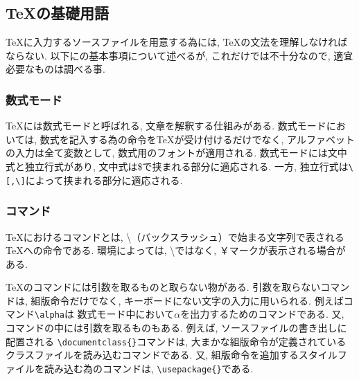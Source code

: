 \documentclass[12pt,xelatex,ja=standard]{bxjsarticle}
\begin{document}
\subsection{\TeX の基礎用語}
\TeX に入力するソースファイルを用意する為には,
\TeX の文法を理解しなければならない.
以下に\XeLaTeX の基本事項について述べるが,
これだけでは不十分なので,
適宜必要なものは調べる事.

\subsubsection{数式モード}
\TeX には数式モードと呼ばれる,
文章を解釈する仕組みがある.
数式モードにおいては,
数式を記入する為の命令を\TeX が受け付けるだけでなく,
アルファベットの入力は全て変数として,
数式用のフォントが適用される.
数式モードには文中式と独立行式があり,
文中式は\$で挟まれる部分に適応される.
一方, 独立行式は\verb:\[,\]:によって挟まれる部分に適応される.

\subsubsection{コマンド}
\TeX におけるコマンドとは,
\textbackslash （バックスラッシュ）で始まる文字列で表される\TeX への命令である.
環境によっては,
\textbackslash ではなく, ￥マークが表示される場合がある.

\TeX のコマンドには引数を取るものと取らない物がある.
引数を取らないコマンドは,
組版命令だけでなく, キーボードにない文字の入力に用いられる.
例えばコマンド\verb:\alpha:は
数式モード中において$α$を出力するためのコマンドである.
又, コマンドの中には引数を取るものもある.
例えば, ソースファイルの書き出しに配置される
\verb:\documentclass{}:コマンドは,
大まかな組版命令が定義されているクラスファイルを読み込むコマンドである.
又, 組版命令を追加するスタイルファイルを読み込む為のコマンドは,
\verb:\usepackage{}:である.
\end{document}
